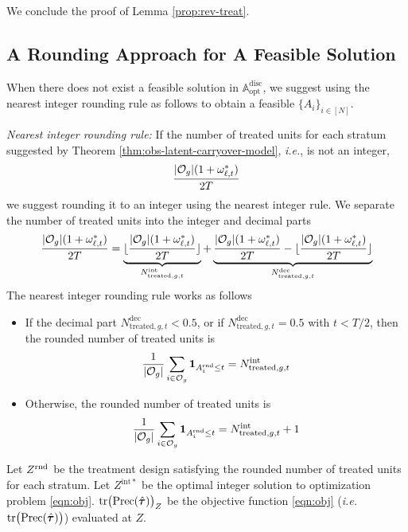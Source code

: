 		We conclude the proof of Lemma \ref{prop:rev-treat}. \Halmos
		\endproof
		
		
		    \subsection{A Rounding Approach for A Feasible Solution}\label{subsubsec:practical-considerations}
    
    When there does not exist a feasible solution in $\mathbb{A}^{\mathrm{disc}}_{\mathrm{opt}}$,  we suggest using the nearest integer rounding rule as follows to obtain a feasible $\{A_i\}_{i \in [N]}$. 
    
	
	\textit{Nearest integer rounding rule:} If the number of treated units for each stratum suggested by Theorem \ref{thm:obs-latent-carryover-model}, {\it i.e.}, is not an integer,
 \[\frac{|\mathcal{O}_g|(1+\omega_{\ell,t}^\ast)}{2T}\]
  we suggest rounding it to an integer using the nearest integer rule. We separate the number of treated units into the integer and decimal parts
 \[\frac{|\mathcal{O}_g|(1+\omega_{\ell,t}^\ast)}{2T} = \underbrace{\lfloor \frac{|\mathcal{O}_g|(1+\omega_{\ell,t}^\ast)}{2T} \rfloor }_{N_{\mathrm{treated},g,t}^{\mathrm{int}}} + \underbrace{\frac{|\mathcal{O}_g|(1+\omega_{\ell,t}^\ast)}{2T} - \lfloor \frac{|\mathcal{O}_g|(1+\omega_{\ell,t}^\ast)}{2T} \rfloor }_{N_{\mathrm{treated},g,t}^{\mathrm{dec}}} \]
 The nearest integer rounding rule works as follows
\begin{itemize}
    \item If the decimal part $N_{\mathrm{treated},g,t}^{\mathrm{dec}} < 0.5$, or if $N_{\mathrm{treated},g,t}^{\mathrm{dec}} = 0.5$ with $t < T/2$, then the rounded number of treated units is 
    \[\frac{1}{|\mathcal{O}_g|} \sum_{i \in \mathcal{O}_g} \boldsymbol{1}_{A^{\textnormal{rnd}}_i \leq t} = N_{\mathrm{treated},g,t}^{\mathrm{int}}  \]
    \item Otherwise, the rounded number of treated units is
    \[\frac{1}{|\mathcal{O}_g|} \sum_{i \in \mathcal{O}_g} \boldsymbol{1}_{A^{\textnormal{rnd}}_i \leq t} = N_{\mathrm{treated},g,t}^{\mathrm{int}} + 1  \]
\end{itemize}

Let $Z^{\textnormal{rnd}}$ be the treatment design satisfying the rounded number of treated units for each stratum. Let $Z^{\mathrm{int}\ast}$ be the optimal integer solution to optimization problem \eqref{eqn:obj}. $ \mathrm{tr} \big(\mathrm{Prec}(\hat{\bm{\tau}})  \big)_{Z} $ be the objective function \eqref{eqn:obj} ({\it i.e.} $\mathrm{tr} \big(\mathrm{Prec}(\hat{\bm{\tau}})  \big)$) evaluated at $Z$.
 
